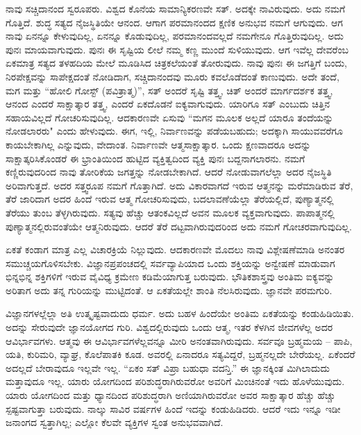 ನಾವು ಸಚ್ಚಿದಾನಂದ ಸ್ವರೂಪರು. ವಿಶ್ವದ ಕೊನೆಯ ಸಾಮಾನ್ಯಿಕರಣವೇ ಸತ್. ಅದಕ್ಕೇ ನಾವಿರುವುದು. ಅದು ನಮಗೆ ಗೊತ್ತಿದೆ. ಶುದ್ಧ ಸತ್ಯದ ನೈಜಸ್ಥಿತಿಯೇ ಆನಂದ. ಆಗಾಗ ಪರಮಾನಂದದ ಕ್ಷಣಿಕ ಅನುಭವ ನಮಗೆ ಆಗುವುದು. ಆಗ ನಾವು ಏನನ್ನೂ ಕೇಳುವುದಿಲ್ಲ, ಏನನ್ನೂ ಕೊಡುವುದಿಲ್ಲ, ಪರಮಾನಂದವಲ್ಲದೆ ನಮಗೇನೂ ಗೊತ್ತಿರುವುದಿಲ್ಲ. ಅದು ಪುನಃ ಮಾಯವಾಗುವುದು. ಪುನಃ ಈ ಸೃಷ್ಟಿಯ ಲೀಲೆ ನಮ್ಮ ಕಣ್ಣ ಮುಂದೆ ಸುಳಿಯುವುದು. ಆಗ ಇವೆಲ್ಲ ದೇವರೆಂಬ ಏಕಮಾತ್ರ ಸತ್ಯದ ತಳಹದಿಯ ಮೇಲೆ ಮೂಡಿಸಿದ ಚಿತ್ರಕಲೆಯಂತೆ ತೋರುವುದು. ನಾವು ಪುನಃ ಈ ಜಗತ್ತಿಗೆ ಬಂದು, ನಿರಪೇಕ್ಷವನ್ನು ಸಾಪೇಕ್ಷದಂತೆ ನೋಡಿದಾಗ, ಸಚ್ಚಿದಾನಂದವು ಮೂರು ಕವಲೊಡೆದಂತೆ ಕಾಣುವುದು. ಅದೇ ತಂದೆ, ಮಗ ಮತ್ತು “ಹೋಲಿ ಗೋಸ್ಟ್ (ಪವಿತ್ರಾತ್ಮ)'', ಸತ್ ಅಂದರೆ ಸೃಷ್ಟಿ ತತ್ತ್ವ, ಚಿತ್ ಅಂದರೆ ಮಾರ್ಗದರ್ಶಕ ತತ್ತ್ವ, ಆನಂದ ಎಂದರೆ ಸಾಕ್ಷಾತ್ಕಾರ ತತ್ತ್ವ, ಎಂದರೆ ಏಕದೊಡನೆ ಐಕ್ಯವಾಗುವುದು. ಯಾರಿಗೂ ಸತ್ ಎಂಬುದು ಚಿತ್ತಿನ ಸಹಾಯವಿಲ್ಲದೆ ಗೋಚರಿಸುವುದಿಲ್ಲ. ಆದಕಾರಣವೇ ಏಸುವು “ಮಗನ ಮೂಲಕ ಅಲ್ಲದೆ ಯಾರೂ ತಂದೆಯನ್ನು ನೋಡಲಾರರು" ಎಂದು ಹೇಳುವುದು. ಈಗ, ಇಲ್ಲಿ, ನಿರ್ವಾಣವನ್ನು ಪಡೆಯಬಹುದು; ಅದಕ್ಕಾಗಿ ಸಾಯುವವರೆಗೂ ಕಾಯಬೇಕಾಗಿಲ್ಲ ಎನ್ನುವುದು, ವೇದಾಂತ. ನಿರ್ವಾಣವೇ ಆತ್ಮಸಾಕ್ಷಾತ್ಕಾರ. ಒಂದು ಕ್ಷಣವಾದರೂ ಅದನ್ನು ಸಾಕ್ಷಾತ್ಕರಿಸಿಕೊಂಡರೆ ಈ ಭ್ರಾಂತಿಯಿಂದ ಹುಟ್ಟಿದ ವ್ಯಕ್ತಿತ್ವದಿಂದ ವ್ಯಕ್ತಿ ಪುನಃ ಬದ್ದನಾಗಲಾರನು. ನಮಗೆ ಕಣ್ಣಿರುವುದರಿಂದ ನಾವು ತೋರಿಕೆಯ ಜಗತ್ತನ್ನು ನೋಡಬೇಕಾಗಿದೆ. ಆದರೆ ನೋಡುವಾಗಲೆಲ್ಲಾ ಅದರ ನೈಜಸ್ಥಿತಿ ಅರಿವಾಗುತ್ತದೆ. ಅದರ ಸತ್ತ್ವರೂಪ ನಮಗೆ ಗೊತ್ತಾಗಿದೆ. ಅದು ವಿಕಾರವಾಗದೆ ಇರುವ ಆತ್ಮನನ್ನು ಮರೆಮಾಡಿರುವ ತೆರೆ, ತೆರೆ ಜಾರಿದಾಗ ಅದರ ಹಿಂದೆ ಇರುವ ಆತ್ಮ ಗೋಚರಿಸುವುದು, ಬದಲಾವಣೆಯೆಲ್ಲಾ ತೆರೆಯಲ್ಲಿದೆ, ಪುಣ್ಯಾತ್ಮನಲ್ಲಿ ತೆರೆಯು ತುಂಬ ತೆಳ್ಳಗಿರುವುದು. ಸತ್ಯವು ಹೆಚ್ಚು ಆತಂಕವಿಲ್ಲದೆ ಅವನ ಮೂಲಕ ವ್ಯಕ್ತವಾಗುವುದು. ಪಾಪಾತ್ಮನಲ್ಲಿ ಪುಣ್ಯಾತ್ಮನಲ್ಲಿರುವಂತೆಯೇ ಆತ್ಮನಿರುವುದು. ಆದರೆ ತೆರೆ ದಟ್ಟವಾಗಿರುವುದರಿಂದ ಅದು ನಮಗೆ ಗೋಚರವಾಗುವುದಿಲ್ಲ.

ಏಕತೆ ಕಂಡಾಗ ಮಾತ್ರ ಎಲ್ಲ ವಿಚಾರಕ್ರಿಯೆ ನಿಲ್ಲುವುದು. ಆದಕಾರಣವೇ ಮೊದಲು ನಾವು ವಿಶ್ಲೇಷಣೆಮಾಡಿ ಅನಂತರ ಸಮುಚ್ಚಯಗೊಳಿಸಬೇಕು. ವಿಜ್ಞಾನಪ್ರಪಂಚದಲ್ಲಿ ಸರ್ವವ್ಯಾಪಿಯಾದ ಒಂದು ಶಕ್ತಿಯನ್ನು ಅನ್ವೇಷಣೆ ಮಾಡುವಾಗ ಭಿನ್ನಭಿನ್ನ ಶಕ್ತಿಗಳಿಗೆ ಇರುವ ವೈವಿಧ್ಯ ಕ್ರಮೇಣ ಕಡಿಮೆಯಾಗುತ್ತ ಬರುವುದು. ಭೌತಿಕಶಾಸ್ತ್ರವು ಅಂತಿಮ ಐಕ್ಯವನ್ನು ಅರಿತಾಗ ಅದು ತನ್ನ ಗುರಿಯನ್ನು ಮುಟ್ಟಿದಂತೆ. ಆ ಏಕತೆಯಲ್ಲೇ ಶಾಂತಿ ನೆಲಸಿರುವುದು. ಜ್ಞಾನವೇ ಪರಮಗುರಿ.

ವಿಜ್ಞಾನಗಳಲ್ಲೆಲ್ಲಾ ಅತಿ ಉತ್ಕೃಷ್ಟವಾದುದು ಧರ್ಮ. ಅದು ಬಹಳ ಹಿಂದೆಯೇ ಅಂತಿಮ ಏಕತೆಯನ್ನು ಕಂಡುಹಿಡಿಯಿತು. ಅದನ್ನು ಸೇರುವುದೇ ಜ್ಞಾನಯೋಗದ ಗುರಿ. ವಿಶ್ವದಲ್ಲಿರುವುದು ಒಂದು ಆತ್ಮ, ಇತರ ಕೆಳಗಿನ ಜೀವಗಳೆಲ್ಲ ಅದರ ಆವಿರ್ಭಾವಗಳು. ಆತ್ಮವು ಈ ಆವಿರ್ಭಾವಗಳೆಲ್ಲವನ್ನೂ ಮೀರಿ ಅನಂತವಾಗಿರುವುದು. ಸರ್ವವೂ ಬ್ರಹ್ಮಮಯ – ಪಾಪಿ, ಯತಿ, ಕುರಿಮರಿ, ವ್ಯಾಘ್ರ, ಕೊಲೆಪಾತಕಿ ಕೂಡ. ಅವರಲ್ಲಿ ಏನಾದರೂ ಸತ್ಯವಿದ್ದರೆ, ಬ್ರಹ್ಮನಲ್ಲದೇ ಬೇರೆಯಲ್ಲ. ಏಕೆಂದರೆ ಅದಲ್ಲದೆ ಬೇರಾವುದೂ ಇಲ್ಲವೇ ಇಲ್ಲ. “ಏಕಂ ಸತ್ ವಿಪ್ರಾ ಬಹುಧಾ ವದನ್ತಿ.” ಈ ಜ್ಞಾನಕ್ಕಿಂತ ಮಿಗಿಲಾದುದು ಮತ್ತಾವುದೂ ಇಲ್ಲ. ಯಾರು ಯೋಗದಿಂದ ಪರಿಶುದ್ಧರಾಗಿರುವರೋ ಅವರಿಗೆ ಮಿಂಚಿನಂತೆ ಇದು ಹೊಳೆಯುವುದು. ಯಾರು ಯೋಗದಿಂದ ಮತ್ತು ಧ್ಯಾನದಿಂದ ಪರಿಶುದ್ಧರಾಗಿ ಅಣಿಯಾಗಿರುವರೋ ಅವರ ಸಾಕ್ಷಾತ್ಕಾರ ಹೆಚ್ಚು ಹೆಚ್ಚು ಸ್ಪಷ್ಟವಾಗುತ್ತಾ ಬರುವುದು. ನಾಲ್ಕು ಸಾವಿರ ವರ್ಷಗಳ ಹಿಂದೆ ಇದನ್ನು ಕಂಡುಹಿಡಿದರು. ಆದರೆ ಇದು ಇನ್ನೂ ಇಡೀ ಜನಾಂಗದ ಸ್ವತ್ತಾಗಿಲ್ಲ; ಎಲ್ಲೋ ಕೆಲವೇ ವ್ಯಕ್ತಿಗಳ ಸ್ವಂತ ಅನುಭವವಾಗಿದೆ.

